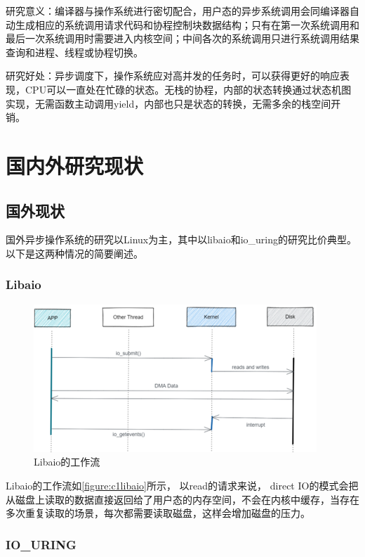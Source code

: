 研究意义：编译器与操作系统进行密切配合，用户态的异步系统调用会同编译器自动生成相应的系统调用请求代码和协程控制块数据结构；只有在第一次系统调用和最后一次系统调用时需要进入内核空间；中间各次的系统调用只进行系统调用结果查询和进程、线程或协程切换。

研究好处：异步调度下，操作系统应对高并发的任务时，可以获得更好的响应表现，CPU可以一直处在忙碌的状态。无栈的协程，内部的状态转换通过状态机图实现，无需函数主动调用yield，内部也只是状态的转换，无需多余的栈空间开销。

\section{国内外研究现状}

\subsection{国外现状}
国外异步操作系统的研究以Linux为主，其中以libaio和io\_uring的研究比价典型。以下是这两种情况的简要阐述。

\subsubsection{Libaio}

\begin{figure}[htb]
    \figureCapSet
    \centering
    \includegraphics[width=.8\linewidth]{figure/c1/libaio.png}
    \caption{Libaio的工作流}
    \label{figure:c1libaio}
\end{figure}

Libaio的工作流如\autoref{figure:c1libaio}所示， 以read的请求来说， direct IO的模式会把从磁盘上读取的数据直接返回给了用户态的内存空间，不会在内核中缓存，当存在多次重复读取的场景，每次都需要读取磁盘，这样会增加磁盘的压力。


\subsubsection{IO\_URING}

